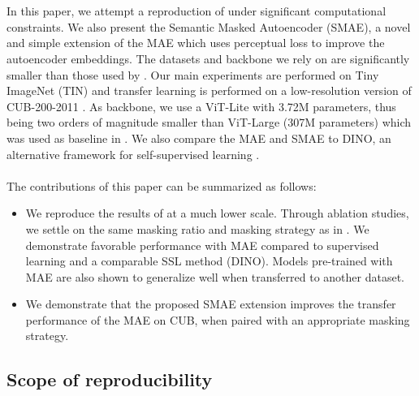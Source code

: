 \\\\
In this paper, we attempt a reproduction of \cite{mae} under significant computational constraints. We also present the Semantic Masked Autoencoder (SMAE), a novel and simple extension of the MAE which uses perceptual loss to improve the autoencoder embeddings. The datasets and backbone we rely on are significantly smaller than those used by \cite{mae}. Our main experiments are performed on Tiny ImageNet (TIN) \cite{tin} and transfer learning is performed on a low-resolution version of CUB-200-2011 \cite{cub}. As backbone, we use a ViT-Lite \cite{hassani} with 3.72M parameters, thus being two orders of magnitude smaller than ViT-Large (307M parameters) which was used as baseline in \cite{mae}. We also compare the MAE and SMAE to DINO, an alternative framework for self-supervised learning \cite{dino}.
\\\\
The contributions of this paper can be summarized as follows:
\begin{itemize}
    \item We reproduce the results of \cite{mae} at a much lower scale. Through ablation studies, we settle on the same masking ratio and masking strategy as in \cite{mae}. We demonstrate favorable performance with MAE compared to supervised learning and a comparable SSL method (DINO). Models pre-trained with MAE are also shown to generalize well when transferred to another dataset.
    
    \item We demonstrate that the proposed SMAE extension improves the transfer performance of the MAE on CUB, when paired with an appropriate masking strategy.
\end{itemize}

\subsection{Scope of reproducibility}
\label{sec:claims}

